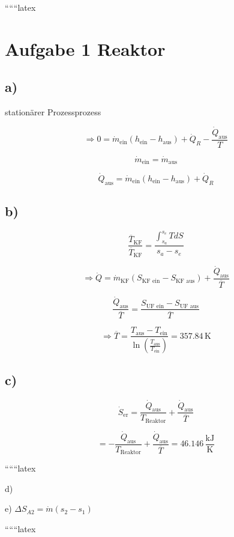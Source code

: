 
``````latex


\section*{Aufgabe 1 Reaktor}

\subsection*{a)}
stationärer Prozessprozess

\[
\Rightarrow 0 = \dot{m}_{\text{ein}} (h_{\text{ein}} - h_{\text{aus}}) + \dot{Q}_R - \frac{\dot{Q}_{\text{aus}}}{T}
\]

\[
\dot{m}_{\text{ein}} = \dot{m}_{\text{aus}}
\]

\[
\dot{Q}_{\text{aus}} = \dot{m}_{\text{ein}} (h_{\text{ein}} - h_{\text{aus}}) + \dot{Q}_R
\]

\subsection*{b)}

\[
\frac{\overline{T}_{\text{KF}}}{\overline{T}_{\text{KF}}} = \frac{\int_{s_a}^{s_e} T dS}{s_a - s_e}
\]

\[
\Rightarrow \dot{Q} = \dot{m}_{\text{KF}} (S_{\text{KF ein}} - S_{\text{KF aus}}) + \frac{\dot{Q}_{\text{aus}}}{\overline{T}}
\]

\[
\frac{\dot{Q}_{\text{aus}}}{\overline{T}} = \frac{S_{\text{UF ein}} - S_{\text{UF aus}}}{\overline{T}}
\]

\[
\Rightarrow \overline{T} = \frac{T_{\text{aus}} - T_{\text{ein}}}{\ln \left( \frac{T_{\text{aus}}}{T_{\text{ein}}} \right)} = 357.84 \, \text{K}
\]

\subsection*{c)}

\[
\dot{S}_{\text{er}} = \frac{\dot{Q}_{\text{aus}}}{T_{\text{Reaktor}}} + \frac{\dot{Q}_{\text{aus}}}{\overline{T}}
\]

\[
= -\frac{\dot{Q}_{\text{aus}}}{T_{\text{Reaktor}}} + \frac{\dot{Q}_{\text{aus}}}{\overline{T}} = 46.146 \, \frac{\text{kJ}}{\text{K}}
\]

``````latex


d)

e) \(\Delta S_{A2} = \dot{m} (s_2 - s_1)\)

``````latex


